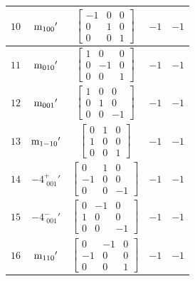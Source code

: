 \documentclass[fleqn,8pt]{jsarticle}
\begin{document}
\begin{longtable}{ccccc}
$ 10 $ & $ {\rm m}_{100}{}' $ & $ \begin{bmatrix} -1 & 0 & 0 \\ 0 & 1 & 0 \\ 0 & 0 & 1 \end{bmatrix} $ & $ -1 $ & $ -1 $ \\ \hline
$ 11 $ & $ {\rm m}_{010}{}' $ & $ \begin{bmatrix} 1 & 0 & 0 \\ 0 & -1 & 0 \\ 0 & 0 & 1 \end{bmatrix} $ & $ -1 $ & $ -1 $ \\ \hline
$ 12 $ & $ {\rm m}_{001}{}' $ & $ \begin{bmatrix} 1 & 0 & 0 \\ 0 & 1 & 0 \\ 0 & 0 & -1 \end{bmatrix} $ & $ -1 $ & $ -1 $ \\ \hline
$ 13 $ & $ {\rm m}_{1-10}{}' $ & $ \begin{bmatrix} 0 & 1 & 0 \\ 1 & 0 & 0 \\ 0 & 0 & 1 \end{bmatrix} $ & $ -1 $ & $ -1 $ \\ \hline
$ 14 $ & $ -4^{+}_{\,\,001}{}' $ & $ \begin{bmatrix} 0 & 1 & 0 \\ -1 & 0 & 0 \\ 0 & 0 & -1 \end{bmatrix} $ & $ -1 $ & $ -1 $ \\ \hline
$ 15 $ & $ -4^{-}_{\,\,001}{}' $ & $ \begin{bmatrix} 0 & -1 & 0 \\ 1 & 0 & 0 \\ 0 & 0 & -1 \end{bmatrix} $ & $ -1 $ & $ -1 $ \\ \hline
$ 16 $ & $ {\rm m}_{110}{}' $ & $ \begin{bmatrix} 0 & -1 & 0 \\ -1 & 0 & 0 \\ 0 & 0 & 1 \end{bmatrix} $ & $ -1 $ & $ -1 $ \\
\end{longtable}
\end{document}

